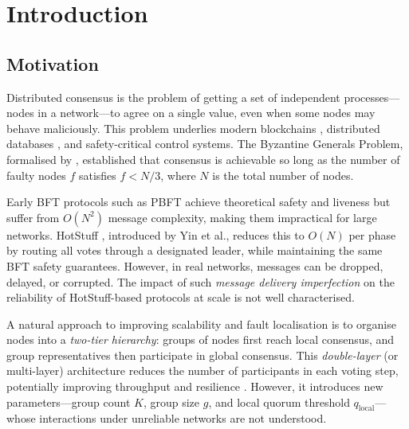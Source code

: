 \documentclass[
12pt,
oneside,
singlespacing,
parskip,
]{article}
\begin{document}
\tableofcontents
\pagebreak


\pagestyle{plain}

\section{Introduction}
\label{sec:intro}

\subsection{Motivation}

Distributed consensus is the problem of getting a set of independent processes---nodes in a network---to agree on a single value, even when some nodes may behave maliciously. This problem underlies modern blockchains \citep{nakamoto2008bitcoin}, distributed databases \citep{lamport2001paxos}, and safety-critical control systems. The Byzantine Generals Problem, formalised by \citet{lamport1982byzantine}, established that consensus is achievable so long as the number of faulty nodes $f$ satisfies $f < N/3$, where $N$ is the total number of nodes.

Early BFT protocols such as PBFT \citep{castro1999practical} achieve theoretical safety and liveness but suffer from $O(N^2)$ message complexity, making them impractical for large networks. HotStuff \citep{yin2019hotstuff}, introduced by Yin et al., reduces this to $O(N)$ per phase by routing all votes through a designated leader, while maintaining the same BFT safety guarantees. However, in real networks, messages can be dropped, delayed, or corrupted. The impact of such \emph{message delivery imperfection} on the reliability of HotStuff-based protocols at scale is not well characterised.

A natural approach to improving scalability and fault localisation is to organise nodes into a \emph{two-tier hierarchy}: groups of nodes first reach local consensus, and group representatives then participate in global consensus. This \emph{double-layer} (or multi-layer) architecture reduces the number of participants in each voting step, potentially improving throughput and resilience \citep{buterin2017casper}. However, it introduces new parameters---group count $K$, group size $g$, and local quorum threshold $q_\mathrm{local}$---whose interactions under unreliable networks are not understood.
\end{document}
